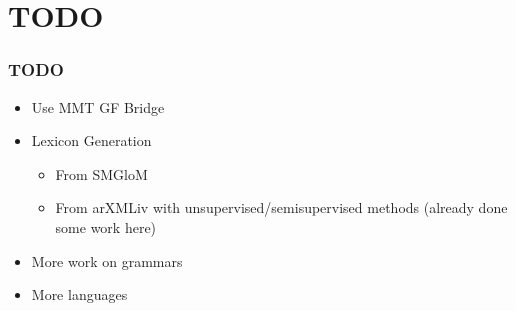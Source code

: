 \documentclass{beamer}
\begin{document}
\section{TODO}
\begin{frame}[fragile]
    \frametitle{TODO}
    \begin{itemize}
        \item Use MMT GF Bridge
        \item Lexicon Generation
            \begin{itemize}
                \item From SMGloM
                \item From arXMLiv with unsupervised/semisupervised methods (already done some work here)
            \end{itemize}
        \item More work on grammars
        \item More languages
    \end{itemize}
\end{frame}
\end{document}
